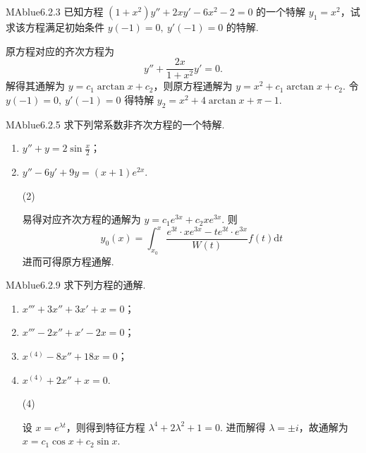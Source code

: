 \begin{problem}{MAblue}{6.2.3}
    已知方程 $(1+x^2)y'' + 2xy' - 6x^2 - 2 = 0$ 的一个特解 $y_1 = x^2$，试求该方程满足初始条件 $y(-1) = 0,\ y'(-1) = 0$ 的特解.
\end{problem}

\begin{solution}
    原方程对应的齐次方程为
    \[
        y'' + \frac{2x}{1 + x^2} y' = 0.
    \]
    解得其通解为 $y = c_1 \arctan x + c_2$，则原方程通解为 $y = x^2 + c_1 \arctan x + c_2$. 令 $y(-1) = 0,\ y'(-1) = 0$ 得特解 $y_2 = x^2 + 4\arctan x + \pi-1$.
\end{solution}

\begin{problem}{MAblue}{6.2.5}
    求下列常系数非齐次方程的一个特解.
    \begin{enumerate}[label={(\arabic*)}]
        \item $y'' + y = 2\sin\frac x 2$；
        \item $y'' - 6y' + 9y = (x+1)e^{2x}$.
    \end{enumerate}
\end{problem}

\begin{enumerate}
    \item[(2)]
    \begin{solution}
        易得对应齐次方程的通解为 $y = c_1 e^{3x} + c_2 x e^{3x}$. 则
        \[
            y_0(x) = \int_{x_0}^x \frac{e^{3t} \cdot xe^{3x} - te^{3t} \cdot e^{3x}}{W(t)} f(t) \mathrm dt
        \]
        进而可得原方程通解.
    \end{solution}
\end{enumerate}

\begin{problem}{MAblue}{6.2.9}
    求下列方程的通解.
    \begin{enumerate}[label={(\arabic*)}]
        \item $x''' + 3x'' + 3x' + x = 0$；
        \item $x''' - 2x'' + x' - 2x = 0$；
        \item $x^{(4)} - 8x'' + 18x = 0$；
        \item $x^{(4)} + 2x'' + x = 0$.
    \end{enumerate}
\end{problem}

\begin{enumerate}
    \item[(4)]
    \begin{solution}
        设 $x = e^{\lambda t}$，则得到特征方程 $\lambda^4 + 2\lambda^2 + 1 = 0$. 进而解得 $\lambda = \pm i$，故通解为 $x = c_1 \cos x + c_2 \sin x$.
    \end{solution}
    
\end{enumerate}